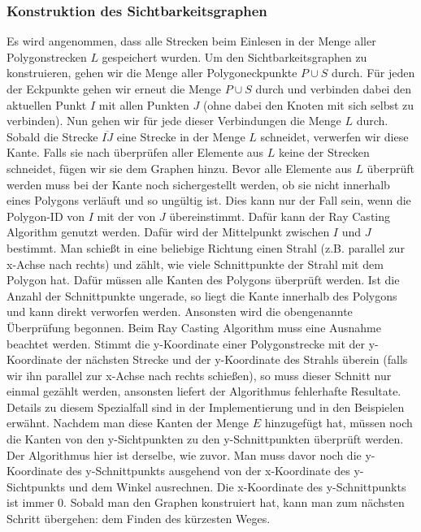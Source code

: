 \documentclass[a4paper,10pt,ngerman]{scrartcl}
\begin{document}
\subsubsection{Konstruktion des Sichtbarkeitsgraphen}
Es wird angenommen, dass alle Strecken beim Einlesen in der Menge aller Polygonstrecken $L$ gespeichert wurden. Um den Sichtbarkeitsgraphen zu konstruieren, gehen wir die Menge aller Polygoneckpunkte $P \cup S$ durch. Für jeden der Eckpunkte gehen wir erneut die Menge $P \cup S$ durch und verbinden dabei den aktuellen Punkt $I$ mit allen Punkten $J$ (ohne dabei den Knoten mit sich selbst zu verbinden). Nun gehen wir für jede dieser Verbindungen die Menge $L$ durch. Sobald die Strecke $\overline{IJ}$ eine Strecke in der Menge $L$ schneidet, verwerfen wir diese Kante. Falls sie nach überprüfen aller Elemente aus $L$ keine der Strecken schneidet, fügen wir sie dem Graphen hinzu. Bevor alle Elemente aus $L$ überprüft werden muss bei der Kante noch sichergestellt werden, ob sie nicht innerhalb eines Polygons verläuft und so ungültig ist. Dies kann nur der Fall sein, wenn die Polygon-ID von $I$ mit der von $J$ übereinstimmt. Dafür kann der Ray Casting Algorithm genutzt werden. Dafür wird der Mittelpunkt zwischen $I$ und $J$ bestimmt. Man schießt in eine beliebige Richtung einen Strahl (z.B. parallel zur x-Achse nach rechts) und zählt, wie viele Schnittpunkte der Strahl mit dem Polygon hat. Dafür müssen alle Kanten des Polygons überprüft werden. Ist die Anzahl der Schnittpunkte ungerade, so liegt die Kante innerhalb des Polygons und kann direkt verworfen werden. Ansonsten wird die obengenannte Überprüfung begonnen. Beim Ray Casting Algorithm muss eine Ausnahme beachtet werden. Stimmt die y-Koordinate einer Polygonstrecke mit der y-Koordinate der nächsten Strecke und der y-Koordinate des Strahls überein (falls wir ihn parallel zur x-Achse nach rechts schießen), so muss dieser Schnitt nur einmal gezählt werden, ansonsten liefert der Algorithmus fehlerhafte Resultate. Details zu diesem Spezialfall sind in der Implementierung und in den Beispielen erwähnt.\linebreak
Nachdem man diese Kanten der Menge $E$ hinzugefügt hat, müssen noch die Kanten von den y-Sichtpunkten zu den y-Schnittpunkten überprüft werden. Der Algorithmus hier ist derselbe, wie zuvor. Man muss davor noch die y-Koordinate des y-Schnittpunkts ausgehend von der x-Koordinate des y-Sichtpunkts und dem Winkel ausrechnen. Die x-Koordinate des y-Schnittpunkts ist immer $0$. Sobald man den Graphen konstruiert hat, kann man zum nächsten Schritt übergehen: dem Finden des kürzesten Weges.
\end{document}
